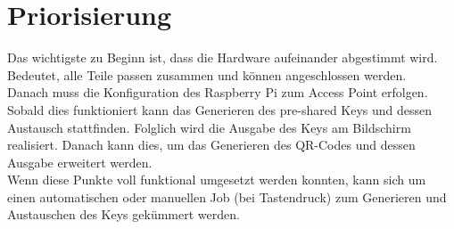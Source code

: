 \documentclass[a4paper,11pt,singlespacing]{article}
\begin{document}
	\section{Priorisierung}
	
	Das wichtigste zu Beginn ist, dass die Hardware aufeinander abgestimmt wird. Bedeutet, alle Teile passen zusammen und können angeschlossen werden.\\
	Danach muss die Konfiguration des Raspberry Pi zum Access Point erfolgen. Sobald dies funktioniert kann das Generieren des pre-shared Keys und dessen Austausch stattfinden. Folglich wird die Ausgabe des Keys am Bildschirm realisiert. Danach kann dies, um das Generieren des QR-Codes und dessen Ausgabe erweitert werden.\\
	Wenn diese Punkte voll funktional umgesetzt werden konnten, kann sich um einen automatischen oder manuellen Job (bei Tastendruck) zum Generieren und Austauschen des Keys gekümmert werden.
	
\end{document}
